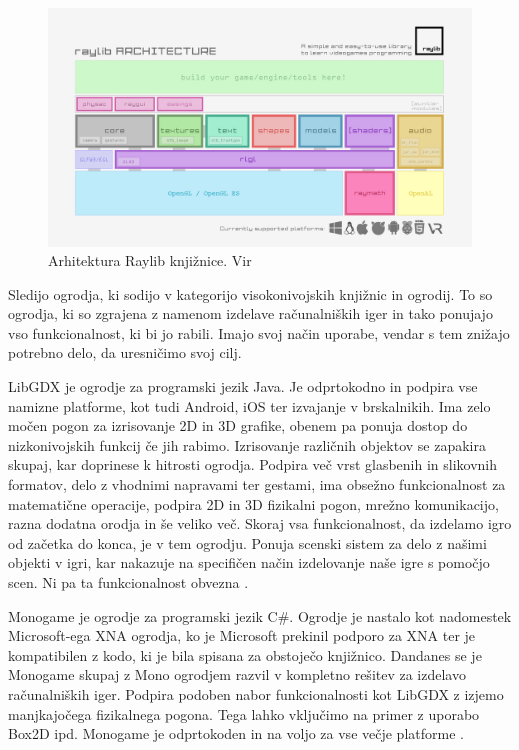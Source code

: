 \documentclass[12pt,a4paper,twoside]{book}
\begin{document}
\begin{figure}[h]
	\centering
	\includegraphics[width=12cm]{raylib_architecture}
	\caption{Arhitektura Raylib knjižnice. Vir \cite{raylib}}
	\label{slika:raylib}
\end{figure}

Sledijo ogrodja, ki sodijo v kategorijo visokonivojskih knjižnic in ogrodij. To so ogrodja, ki so zgrajena z namenom izdelave računalniških iger in tako ponujajo vso funkcionalnost, ki bi jo rabili. Imajo svoj način uporabe, vendar s tem znižajo potrebno delo, da uresničimo svoj cilj.

LibGDX je ogrodje za programski jezik Java. Je odprtokodno in podpira vse namizne platforme, kot tudi Android, iOS ter izvajanje v brskalnikih. Ima zelo močen pogon za izrisovanje 2D in 3D grafike, obenem pa ponuja dostop do nizkonivojskih funkcij če jih rabimo. Izrisovanje različnih objektov se zapakira skupaj, kar doprinese k hitrosti ogrodja. Podpira več vrst glasbenih in slikovnih formatov, delo z vhodnimi napravami ter gestami, ima obsežno funkcionalnost za matematične operacije, podpira 2D in 3D fizikalni pogon, mrežno komunikacijo, razna dodatna orodja in še veliko več. Skoraj vsa funkcionalnost, da izdelamo igro od začetka do konca, je v tem ogrodju. Ponuja scenski sistem za delo z našimi objekti v igri, kar nakazuje na specifičen način izdelovanje naše igre s pomočjo scen. Ni pa ta funkcionalnost obvezna \cite{libgdx}.

Monogame je ogrodje za programski jezik C\#. Ogrodje je nastalo kot nadomestek Microsoft-ega XNA ogrodja, ko je Microsoft prekinil podporo za XNA ter je kompatibilen z kodo, ki je bila spisana za obstoječo knjižnico. Dandanes se je Monogame skupaj z Mono ogrodjem razvil v kompletno rešitev za izdelavo računalniških iger. Podpira podoben nabor funkcionalnosti kot LibGDX z izjemo manjkajočega fizikalnega pogona. Tega lahko vključimo na primer z uporabo Box2D ipd. Monogame je odprtokoden in na voljo za vse večje platforme \cite{monogame}.
\end{document}
